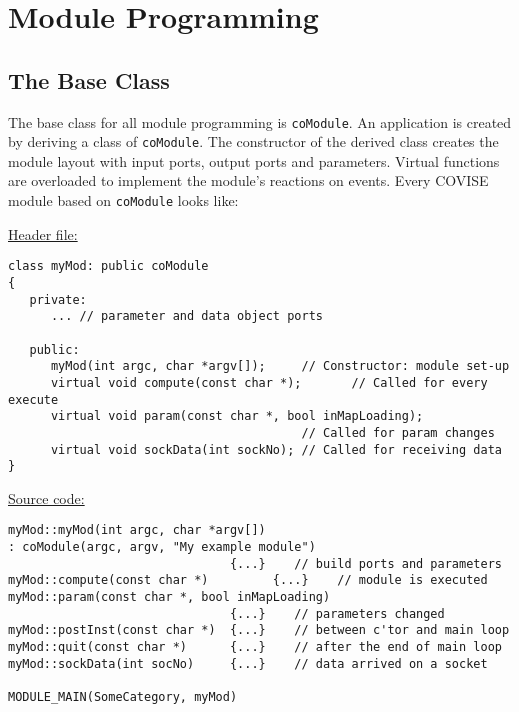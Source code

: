
\begin{htmlonly}

\end{htmlonly}


\startdocument
\chapter{Module Programming}
\label{Module Programming}


\section{The  Base Class}

The base class for all module programming is {\tt coModule}. An application is created 
by deriving a class of {\tt coModule}. The constructor of the derived class creates 
the module layout with input ports, output ports and parameters. Virtual functions are 
overloaded to implement the module's reactions on events.  Every COVISE
module based on {\tt coModule} looks like:

\underline{Header file:}
\begin{verbatim}
class myMod: public coModule
{
   private:
      ... // parameter and data object ports

   public:
      myMod(int argc, char *argv[]);     // Constructor: module set-up
      virtual void compute(const char *);       // Called for every execute
      virtual void param(const char *, bool inMapLoading);
                                         // Called for param changes
      virtual void sockData(int sockNo); // Called for receiving data
}
\end{verbatim}

\underline{Source code:}
\begin{verbatim}
myMod::myMod(int argc, char *argv[])
: coModule(argc, argv, "My example module")
                               {...}    // build ports and parameters
myMod::compute(const char *)         {...}    // module is executed
myMod::param(const char *, bool inMapLoading)
                               {...}    // parameters changed
myMod::postInst(const char *)  {...}    // between c'tor and main loop
myMod::quit(const char *)      {...}    // after the end of main loop
myMod::sockData(int socNo)     {...}    // data arrived on a socket

MODULE_MAIN(SomeCategory, myMod)

\end{verbatim}

